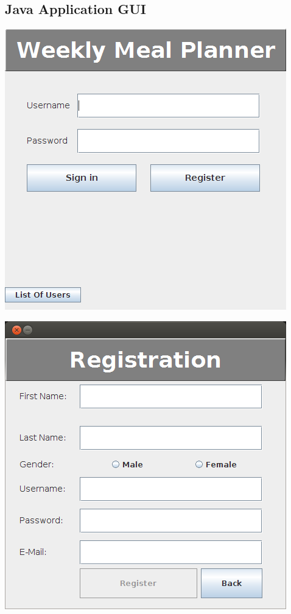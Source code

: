 \documentclass[a4paper,10pt,toc=graduated]{article}
\begin{document}
\begin{appendices}
\section{Java Application GUI}
\includegraphics{screenshots/frmLogin.png}

\includegraphics{screenshots/frmRegistration.png}


\end{appendices}
\end{document}
